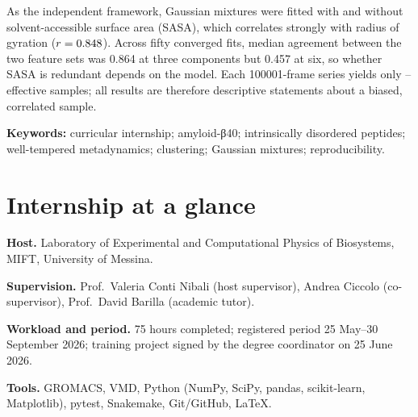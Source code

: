 \documentclass[a4paper,11pt,oneside,numbers=noenddot,headings=normal,bibliography=totoc,listof=totoc]{scrreprt}
\begin{document}
As the independent framework, Gaussian mixtures were fitted with and without solvent-accessible surface area (SASA), which correlates strongly with radius of gyration ($r=0.848{}$). Across fifty converged fits, median agreement between the two feature sets was 0.864 at three components but 0.457 at six, so whether SASA is redundant depends on the model. Each \num{100001}-frame series yields only \ESSMinimum{}--\ESSMaximum{} effective samples; all results are therefore descriptive statements about a biased, correlated sample.

\vspace{5mm}\noindent\textbf{Keywords:} curricular internship; amyloid-β40; intrinsically disordered peptides; well-tempered metadynamics; clustering; Gaussian mixtures; reproducibility.

\chapter*{Internship at a glance}
\begin{keyfindings}
\begin{findings}
\item \textbf{Host.} Laboratory of Experimental and Computational Physics of Biosystems, MIFT, University of Messina.
\item \textbf{Supervision.} Prof.\ Valeria Conti Nibali (host supervisor), Andrea Ciccolo (co-supervisor), Prof.\ David Barilla (academic tutor).
\item \textbf{Workload and period.} 75 hours completed; registered period 25 May--30 September 2026; training project signed by the degree coordinator on 25 June 2026.
\item \textbf{Tools.} GROMACS, VMD, Python (NumPy, SciPy, pandas, scikit-learn, Matplotlib), pytest, Snakemake, Git/GitHub, LaTeX.
\end{findings}
\end{keyfindings}
\end{document}
